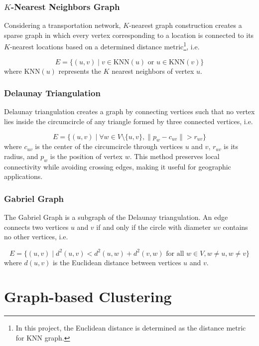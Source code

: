 \subsubsection{$K$-Nearest Neighbors Graph}
Considering a transportation network, $K$-nearest graph construction creates a sparse graph in which every vertex corresponding to a location is connected to its $K$-nearest locations based on a determined distance metric\footnote{In this project, the Euclidean distance is determined as the distance metric for KNN graph.}, i.e.

\begin{equation}
    E = \{(u, v) \mid v \in \text{KNN}(u) \text{ or } u \in \text{KNN}(v)\}
\end{equation}
where $\text{KNN}(u)$ represents the $K$ nearest neighbors of vertex $u$.

\subsubsection{Delaunay Triangulation}
Delaunay triangulation creates a graph by connecting vertices such that no vertex lies inside the circumcircle of any triangle formed by three connected vertices, i.e.  

\begin{equation}
    E = \{(u, v) \mid \forall w \in V \setminus \{u, v\}, \|p_w - c_{uv}\| > r_{uv} \}
\end{equation}
where $c_{uv}$ is the center of the circumcircle through vertices $u$ and $v$, $r_{uv}$ is its radius, and $p_w$ is the position of vertex $w$. This method preserves local connectivity while avoiding crossing edges, making it useful for geographic applications.

\subsubsection{Gabriel Graph}
The Gabriel Graph is a subgraph of the Delaunay triangulation. An edge connects two vertices $u$ and $v$ if and only if the circle with diameter $uv$ contains no other vertices, i.e.

\begin{equation}
    E = \{(u, v) \mid d^2(u, v) < d^2(u, w) + d^2(v, w) \text{ for all } w \in V, w \neq u, w \neq v\}
\end{equation}
where $d(u, v)$ is the Euclidean distance between vertices $u$ and $v$.

\section{Graph-based Clustering}
\label{se:GraphBasedClusterings}


